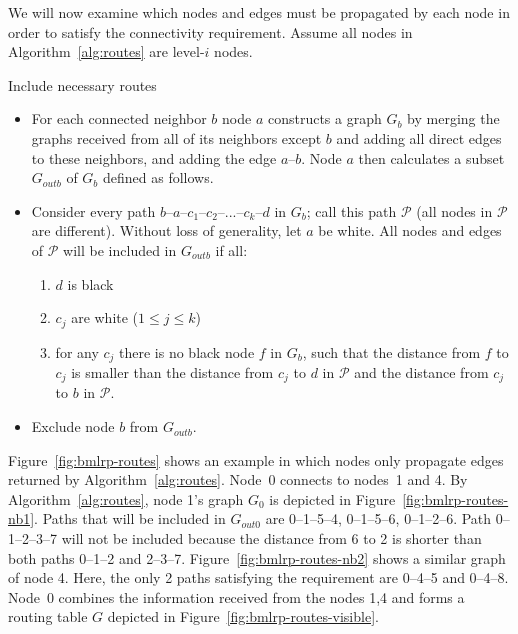 \documentclass[conference]{IEEEtran}
\theoremstyle{definition}
\newcommand{\cP}{{\mathcal{P}}}
\begin{document}
We will now examine which nodes and edges must be propagated by each node in order to satisfy the connectivity requirement. Assume all nodes in Algorithm~\ref{alg:routes} are level-$i$ nodes.

\begin{algorithm}[H]
    \caption{Include necessary routes}
    \label{alg:routes}
    
    \begin{itemize} 
        \item   For each connected neighbor $b$ node $a$ constructs a graph $G_b$ by merging the graphs received from all of its neighbors except $b$ and adding all direct edges to these neighbors, and adding the edge $a$--$b$. Node $a$ then calculates a subset $G_{outb}$ of $G_b$ defined as follows.

        \item   Consider every path $b$--$a$--$c_1$--$c_2$--...--$c_k$--$d$ in $G_b$; call this path $\cP$ (all nodes in $\cP$ are different). Without loss of generality, let $a$ be white. All nodes and edges of $\cP$ will be included in $G_{outb}$ if all:
        \begin{enumerate}
            \item   $d$ is black
            \item   $c_j$ are white ($1 \le j \le k$)
            \item   for any $c_j$ there is no black node $f$ in $G_b$, such that the distance
                    from $f$ to $c_j$ is smaller than the distance 
                    from $c_j$ to $d$ in $\cP$ and the distance from $c_j$ to $b$ in $\cP$.
        \end{enumerate}

        \item   Exclude node $b$ from $G_{outb}$.
    \end{itemize}
\end{algorithm}

Figure~\ref{fig:bmlrp-routes} shows an example in which nodes only propagate edges returned by Algorithm~\ref{alg:routes}. Node~0 connects to nodes~1 and 4. By Algorithm~\ref{alg:routes}, node 1's graph $G_0$ is depicted in Figure~\ref{fig:bmlrp-routes-nb1}. Paths that will be included in $G_{out0}$ are 0--1--5--4, 0--1--5--6, 0--1--2--6. Path 0--1--2--3--7 will not be included because the distance from 6 to 2 is shorter than both paths 0--1--2 and 2--3--7. Figure~\ref{fig:bmlrp-routes-nb2} shows a similar graph of node 4. Here, the only 2 paths satisfying the requirement are 0--4--5 and 0--4--8. Node~0 combines the information received from the nodes 1,4 and forms a routing table $G$ depicted in Figure~\ref{fig:bmlrp-routes-visible}.
\end{document}
